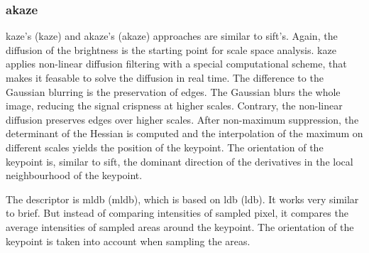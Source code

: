 \subsubsection{\acrshort{akaze}}

\acrshort{kaze}'s\cite{alcantarilla_eccv12} (\acrlong{kaze}) and \acrshort{akaze}'s\cite{alcantarilla_bmva13} (\acrlong{akaze}) approaches are similar to \acrshort{sift}'s.
Again, the diffusion of the brightness is the starting point for scale space analysis.
\acrshort{kaze} applies non-linear diffusion filtering with a special computational scheme, that makes it feasable to solve the diffusion in real time.
The difference to the Gaussian blurring is the preservation of edges.
The Gaussian blurs the whole image, reducing the signal crispness at higher scales.
Contrary, the non-linear diffusion preserves edges over higher scales.
After non-maximum suppression, the determinant of the Hessian is computed and the interpolation of the maximum on different scales yields the position of the keypoint.
The orientation of the keypoint is, similar to \acrshort{sift}, the dominant direction of the derivatives in the local neighbourhood of the keypoint.

The descriptor is \acrshort{mldb} (\acrlong{mldb}), which is based on \acrshort{ldb}\cite{yang_ismar12} (\acrlong{ldb}).
It works very similar to \acrshort{brief}.
But instead of comparing intensities of sampled pixel, it compares the average intensities of sampled areas around the keypoint.
The orientation of the keypoint is taken into account when sampling the areas.
